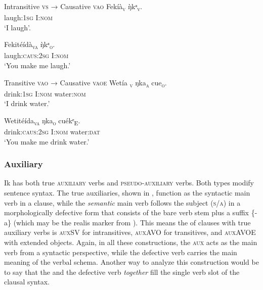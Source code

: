 Intransitive \textsc{vs} → Causative \textsc{vao}
\ea\label{ex:syn:16}
\gll Fekíà\textsc{\textsubscript{v}}     \`{ŋ}kᵃ\textsc{\textsubscript{v}}. \\
laugh:\textsc{1sg}   I:\textsc{nom}    \\
\glt ‘I laugh’. 
\z




\ea\label{ex:syn:17}
\gll Fekitéídà\textsc{\textsubscript{va}}   {\`{ŋ}kᵃ}\textsc{\textsubscript{o}}. \\
laugh:\textsc{caus:2sg} I:\textsc{nom}    \\
\glt ‘You make me laugh.’ 
\z





Transitive \textsc{vao} → Causative \textsc{vaoe}
\ea\label{ex:syn:18}
\gll Wetía\textsc{\textsubscript{ v}}     ŋka\textsc{\textsubscript{a}}     cue\textsc{\textsubscript{o}}. \\
drink:\textsc{1sg}   I:\textsc{nom}   water:\textsc{nom}    \\
\glt ‘I drink water.’ 
\z




\ea\label{ex:syn:19}
\gll Wetitéída\textsc{\textsubscript{va}}   ŋka\textsc{\textsubscript{o}}     cuékᵉ\textsc{\textsubscript{E}}. \\
drink:\textsc{caus:2sg} I:\textsc{nom}    water:\textsc{dat}    \\
\glt ‘You make me drink water.’ 
\z




\subsubsection{Auxiliary}\label{sec:10.2.5} 

Ik has both true \textsc{auxiliary} verbs and \textsc{pseudo-auxiliary} verbs. Both types modify sentence syntax. The true auxiliaries, shown in , function as the syntactic main verb in a clause, while the \textit{semantic} main verb follows the subject (\textsc{s/a}) in a morphologically defective form that consists of the bare verb stem plus a suffix \{-a\} (which may be the realis marker from ). This means the  of clauses with true auxiliary verbs is \textsc{auxSV} for intransitives, \textsc{auxAVO} for transitives, and \textsc{auxAVOE} with extended objects. Again, in all these constructions, the \textsc{aux} acts as the main verb from a syntactic perspective, while the defective verb carries the main meaning of the verbal schema. Another way to analyze this construction would be to say that the  and the defective verb \textit{together} fill the single verb slot of the clausal syntax.

